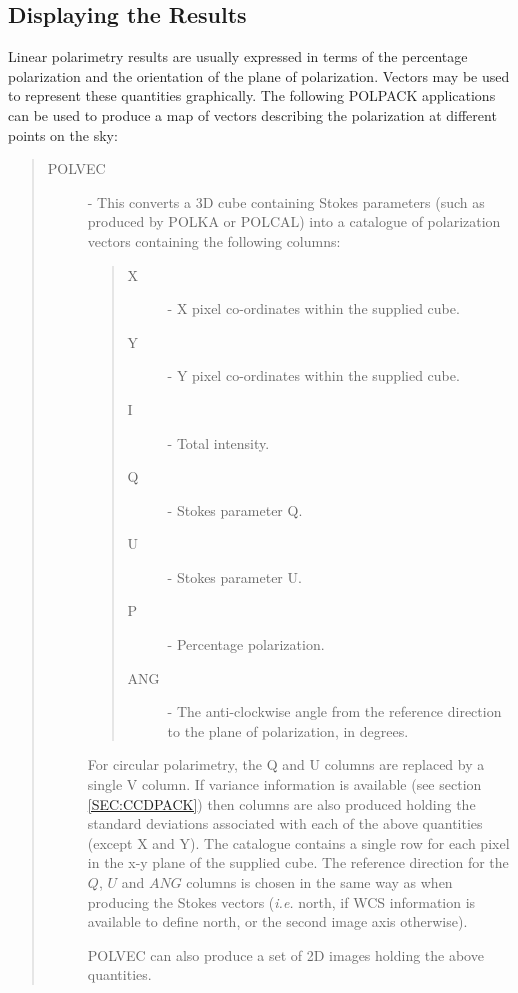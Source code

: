 \documentclass[twoside,11pt]{article}
\newcommand{\hyperref}[4]{#2\ref{#4}#3}
\newcommand{\htmlref}[2]{#1}
\renewcommand{\_}{\texttt{\symbol{95}}}
\begin{document}
\subsection{\label{SEC:DISP}Displaying the Results}
Linear polarimetry results are usually expressed in terms of the
percentage polarization and the orientation of the plane of polarization.
Vectors may be used to represent these quantities graphically. The
following POLPACK applications can be used to produce a map of vectors
describing the polarization at different points on the sky:

\begin{quote}
\begin{description}
\item [\htmlref{POLVEC}{POLVEC}] - This converts a 3D cube containing Stokes parameters
(such as produced by POLKA or POLCAL) into a catalogue of polarization
vectors containing the following columns:

\begin{quote}
\begin{description}
\item [X] - X pixel co-ordinates within the supplied cube.
\item [Y] - Y pixel co-ordinates within the supplied cube.
\item [I] - Total intensity.
\item [Q] - Stokes parameter Q.
\item [U] - Stokes parameter U.
\item [P] - Percentage polarization.
\item [ANG] - The anti-clockwise angle from the reference direction to 
the plane of polarization, in degrees.
\end{description}
\end{quote}

For circular polarimetry, the Q and U columns are replaced by a single V
column. If variance information is available (see \hyperref{here}{section }
{}{SEC:CCDPACK}) then columns are also produced holding the standard
deviations associated with each of the above quantities (except X and Y).
The catalogue contains a single row for each pixel in the x-y plane of
the supplied cube. The reference direction for the $Q$, $U$ and $ANG$
columns is chosen in the same way as when producing the Stokes vectors
(\emph{i.e.} north, if WCS information is available to define north, or
the second image axis otherwise).

POLVEC can also produce a set of 2D images holding the above quantities.


\end{description}
\end{quote}
\end{document}
